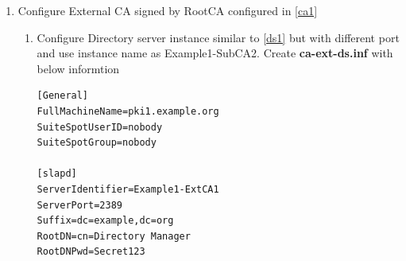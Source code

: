 \documentclass[12pt]{report}
\begin{document}
\begin{enumerate}[label*=\arabic*.]
\begin{enumerate}[label*=\arabic*.]
\begin{lstlisting}[style=configFile]
[Tomcat]
pki_ajp_port=18009
pki_tomcat_server_port=18005

[CA]
pki_subordinate=True
pki_issuing_ca=https://pki1.example.org:8443
pki_ca_signing_subject_dn=cn=CA Subordinate Signing,o=example.org
pki_ds_hostname=pki1.example.org
pki_ds_ldap_port=1389
pki_ds_password=Secret123
pki_ds_secure_connection=False
                    \end{lstlisting}
                \item  Run pkispawn with above configuration to configure SubCA.
                    \begin{lstlisting}[style=bashInputStyle]
$ pkispawn -s CA -f subca1.inf -vv
                    \end{lstlisting}
                \item Verify Subsystem status using systemctl and pkidaemon commands
                    \begin{lstlisting}[style=bashInputStyle]
$ systemctl status pki-tomcatd@Example1-SubCA1
$ pkidaemon status tomcat Example1-SubCA1
                    \end{lstlisting}
                \end{enumerate}
            \item \label{ca3} Configure External CA signed by RootCA configured in \ref{ca1}
                \begin{enumerate}[label*=\arabic*.]
                    \item Configure Directory server instance similar to \ref{ds1} but with different port and use instance name as Example1-SubCA2.
                        Create \textbf{ca-ext-ds.inf} with below informtion
                        \begin{lstlisting}[style=configFile]
[General]
FullMachineName=pki1.example.org 
SuiteSpotUserID=nobody
SuiteSpotGroup=nobody

[slapd]
ServerIdentifier=Example1-ExtCA1
ServerPort=2389
Suffix=dc=example,dc=org
RootDN=cn=Directory Manager
RootDNPwd=Secret123


\end{lstlisting}
\end{enumerate}
\end{enumerate}
\end{document}
